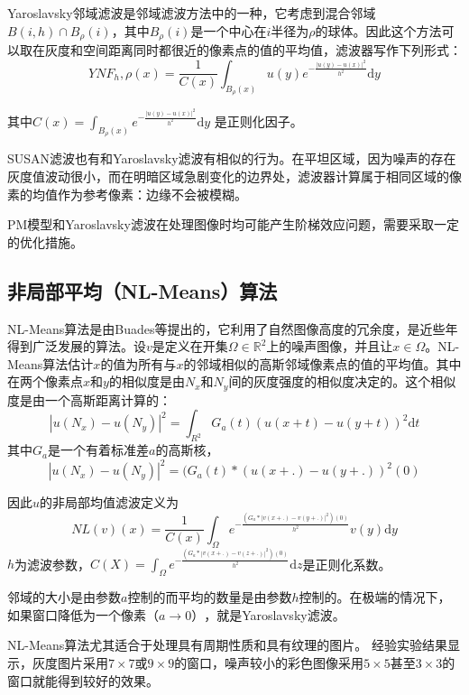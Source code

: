 \documentclass[a4paper,12pt]{article}
\begin{document}
Yaroslavsky邻域滤波是邻域滤波方法中的一种，它考虑到混合邻域$B(i,h)\cap B_\rho(i)$，其中$B_\rho(i)$是一个中心在$i$半径为$\rho$的球体。因此这个方法可以取在灰度和空间距离同时都很近的像素点的值的平均值，滤波器写作下列形式：
\begin{displaymath}
YNF_h,\rho(x)=\frac{1}{C(x)}\int_{B_\rho(x)}u(y)e^{-\frac{|u(y)-u(x)|^2}{h^2}}\mathrm{d}y
\end{displaymath}

其中$C(x)=\int_{B_\rho(x)}e^{-\frac{|u(y)-u(x)|^2}{h^2}}\mathrm{d}y$
是正则化因子。

SUSAN滤波也有和Yaroslavsky滤波有相似的行为。在平坦区域，因为噪声的存在灰度值波动很小，而在明暗区域急剧变化的边界处，滤波器计算属于相同区域的像素的均值作为参考像素：边缘不会被模糊。

PM模型和Yaroslavsky滤波在处理图像时均可能产生阶梯效应问题，需要采取一定的优化措施。

\subsection{非局部平均（NL-Means）算法}
NL-Means算法是由Buades等\cite{buades2004image}提出的，它利用了自然图像高度的冗余度，是近些年得到广泛发展的算法。设$v$是定义在开集$\Omega\in\mathbb{R}^2$上的噪声图像，并且让$x\in\Omega$。NL-Means算法估计$x$的值为所有与$x$的邻域相似的高斯邻域像素点的值的平均值。其中在两个像素点$x$和$y$的相似度是由$N_x$和$N_y$间的灰度强度的相似度决定的。这个相似度是由一个高斯距离计算的：
\begin{displaymath}
|u(N_x)-u(N_y)|^2=\int_{R^2}	G_a(t)(u(x+t)-u(y+t))^2\mathrm{d}t
\end{displaymath}
其中$G_a$是一个有着标准差$a$的高斯核，
\begin{displaymath}
|u(N_x)-u(N_y)|^2=(	G_a(t)\ast(u(x+.)-u(y+.))^2(0)
\end{displaymath}

因此$u$的非局部均值滤波定义为
\begin{displaymath}
NL(v)(x)=\frac{1}{C(x)}\int_{\Omega}e^{-\frac{(G_a\ast|v(x+.)-v(y+.)|^2)(0)}{h^2}}v(y)\mathrm{d}y
\end{displaymath}
$h$为滤波参数，$C(X)=\int_\Omega e^{-\frac{(G_a\ast|v(x+.)-v(z+.)|^2)(0)}{h^2}}\mathrm{d}z$是正则化系数。

邻域的大小是由参数$a$控制的而平均的数量是由参数$h$控制的。在极端的情况下，如果窗口降低为一个像素$（a\rightarrow0）$，就是Yaroslavsky滤波。

NL-Means算法尤其适合于处理具有周期性质和具有纹理的图片。
经验实验结果显示，灰度图片采用$7\times7$或$9\times9$的窗口，噪声较小的彩色图像采用$5\times5$甚至$3\times3$的窗口就能得到较好的效果。
\end{document}
